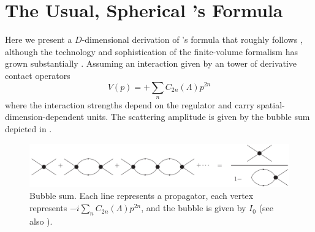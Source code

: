 \section{The Usual, Spherical \Luscher's Formula}\label{sec:spherical}


Here we present a $D$-dimensional derivation of \Luscher's formula that roughly follows , although the technology and sophistication of the finite-volume formalism has grown substantially .  Assuming an interaction given by an tower of derivative contact operators
\begin{equation}
    V(p) = +\sum_n C_{2n}(\Lambda) p^{2n}
\end{equation}
where the interaction strengths depend on the regulator and carry spatial-dimension-dependent units.
The scattering amplitude is given by the bubble sum depicted in .

\begin{figure}[ht!]
\center
\includegraphics[width=.8\columnwidth]{figure/bubbleSum.pdf}
\caption{Bubble sum. Each line represents a propagator, each vertex represents $-i \sum_n C_{2n}(\Lambda) p^{2n}$, and the bubble is given by $I_0$ (see also ).\label{fig:bubbleSum}}
\end{figure}

